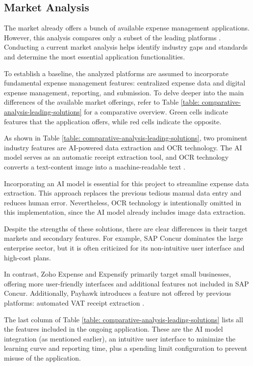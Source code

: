 \subsection{Market Analysis}
\label{sec:market-analysis}

The market already offers a bunch of available expense management applications. However, this analysis compares only a subset of the leading platforms \cite{best-expenses-tools}. Conducting a current market analysis helps identify industry gaps and standards and determine the most essential application functionalities.

To establish a baseline, the analyzed platforms are assumed to incorporate fundamental expense management features: centralized expense data and digital expense management, reporting, and submission. To delve deeper into the main differences of the available market offerings, refer to Table \ref{table: comparative-analysis-leading-solutions} for a comparative overview. Green cells indicate features that the application offers, while red cells indicate the opposite. 

As shown in Table \ref{table: comparative-analysis-leading-solutions}, two prominent industry features are AI-powered data extraction and OCR technology. The AI model serves as an automatic receipt extraction tool, and OCR technology converts a text-content image into a machine-readable text \cite{ocr-technology}.

Incorporating an AI model is essential for this project to streamline expense data extraction. This approach replaces the previous tedious manual data entry and reduces human error. Nevertheless, OCR technology is intentionally omitted in this implementation, since the AI model already includes image data extraction.

Despite the strengths of these solutions, there are clear differences in their target markets and secondary features. For example, SAP Concur dominates the large enterprise sector, but it is often criticized for its non-intuitive user interface and high-cost plans.

In contrast, Zoho Expense and Expensify primarily target small businesses, offering more user-friendly interfaces and additional features not included in SAP Concur. Additionally, Payhawk introduces a feature not offered by previous platforms: automated VAT receipt extraction \cite{expense-management-market} \cite{expense-management-evolution}.

The last column of Table \ref{table: comparative-analysis-leading-solutions} lists all the features included in the ongoing application. These are the AI model integration (as mentioned earlier), an intuitive user interface to minimize the learning curve and reporting time, plus a spending limit configuration to prevent misuse of the application.

